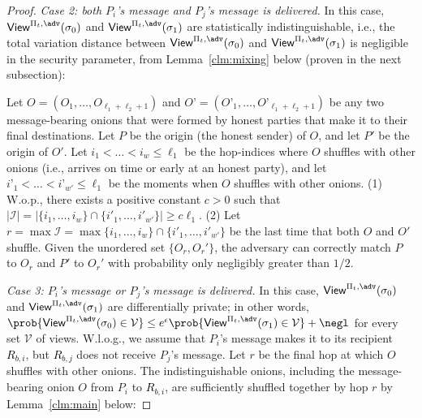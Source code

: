 \documentclass[runningheads,a4paper]{llncs}
\begin{document}
\begin{proof}
\medskip
\noindent \emph{Case 2: both $P_i$'s message and $P_j$'s message is delivered.} In this case, $\mathsf{View}^{\protocol, \adv}(\sigma_0)$ and $\mathsf{View}^{\protocol, \adv}(\sigma_1)$ are statistically indistinguishable, i.e., the total variation distance between $\mathsf{View}^{\protocol, \adv}(\sigma_0)$ and $\mathsf{View}^{\protocol, \adv}(\sigma_1)$ is negligible in the security parameter, from Lemma~\ref{clm:mixing} below (proven in the next subsection): 

\begin{lemma}
\label{clm:mixing}
Let $O = (O_{1}, \dots, O_{\ell_1+\ell_2+1})$ and $O’ = (O’_{1}, \dots, O’_{\ell_1+\ell_2+1})$ be any two message-bearing onions that were formed by honest parties that make it to their final destinations. 
Let $P$ be the origin (the honest sender) of $O$, and let $P'$ be the origin of $O'$. 
Let $i_1 < \dots < i_w \leq \ell_1$ be the hop-indices where $O$ shuffles with other onions (i.e., arrives on time or early at an honest party), and let $i’_1 < \dots < i’_{w'} \leq \ell_1$ be the moments when $O$ shuffles with other onions. 
(1) W.o.p., there exists a positive constant $c >0$ such that 
$|\mathcal{I}| = |\{i_1, \dots, i_w\} \cap \{i'_1, \dots, i'_{w'}\}| \geq c\ell_1$. (2) Let $r = \max \mathcal{I} = \max \{i_1, \dots, i_w\} \cap \{i'_1, \dots, i'_{w'}\}$ 
be the last time that both $O$ and $O'$ shuffle.
Given the unordered set $\{O_r, O_r'\}$, the adversary can correctly match $P$ to $O_r$ and $P'$ to $O_r'$ with probability only negligibly greater than $1/2$. 
\end{lemma}

\noindent \emph{Case 3: $P_i$'s message or $P_j$'s message is delivered.} In this case, $\mathsf{View}^{\protocol, \adv}(\sigma_0)$ and $\mathsf{View}^{\protocol, \adv}(\sigma_1)$ are differentially private; in other words, 
$\prob{\mathsf{View}^{\protocol, \adv}(\sigma_0) \in \mathcal{V}} \le e^\epsilon \prob{\mathsf{View}^{\protocol, \adv}(\sigma_1) \in \mathcal{V}} + \negl 
$ for every set $\mathcal{V}$ of views. 
W.l.o.g., we assume that $P_i$'s message makes it to its recipient \textcolor{black}{$R_{b,i}$}, but \textcolor{black}{$R_{b,j}$} does not receive $P_j$'s message. Let $r$ be the final hop at which $O$ shuffles with other onions. The indistinguishable onions, including the message-bearing onion $O$ from $P_i$ to \textcolor{black}{$R_{b,i}$}, are sufficiently shuffled together by hop $r$ by Lemma~\ref{clm:main} below:


\end{proof}
\end{document}
